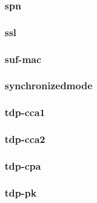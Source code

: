 \begin{frame} \frametitle{spn}
\begin{figure}
\begin{center}

\end{center}
\end{figure}
\end{frame}
\begin{frame} \frametitle{ssl}
\begin{figure}
\begin{center}

\end{center}
\end{figure}
\end{frame}
\begin{frame} \frametitle{suf-mac}
\begin{figure}
\begin{center}

\end{center}
\end{figure}
\end{frame}
\begin{frame} \frametitle{synchronizedmode}
\begin{figure}
\begin{center}

\end{center}
\end{figure}
\end{frame}
\begin{frame} \frametitle{tdp-cca1}
\begin{figure}
\begin{center}

\end{center}
\end{figure}
\end{frame}
\begin{frame} \frametitle{tdp-cca2}
\begin{figure}
\begin{center}

\end{center}
\end{figure}
\end{frame}
\begin{frame} \frametitle{tdp-cpa}
\begin{figure}
\begin{center}

\end{center}
\end{figure}
\end{frame}
\begin{frame} \frametitle{tdp-pk}
\begin{figure}
\begin{center}

\end{center}
\end{figure}
\end{frame}
